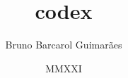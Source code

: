



\usepackage{anyfontsize}
\usepackage{float}
\usepackage{subcaption}
\usepackage{versions}
\usepackage{wrapfig}


\title{codex}
\author{Bruno Barcarol Guimarães}
\date{MMXXI}


    
    \printbibliography

